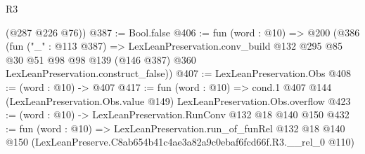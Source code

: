 \begin{lexlean}{R3}
\begin{coremodule}
      (@287 @226 @76))
@387 := Bool.false
@406 := fun (word : @10) =>
  @200
    (@386
      (fun ("_" : @113 @387) =>
      LexLeanPreservation.conv_build
        @132
        @295
        @85
        @30
        @51
        @98
        @98
        @139
        (@146 @387)
        @360
        LexLeanPreservation.construct_false))
@407 := LexLeanPreservation.Obs
@408 := (word : @10) -> @407
@417 := fun (word : @10) =>
  cond.{1} @407 @144 (LexLeanPreservation.Obs.value @149) LexLeanPreservation.Obs.overflow
@423 := (word : @10) -> LexLeanPreservation.RunConv @132 @18 @140 @150
@432 := fun (word : @10) =>
  LexLeanPreservation.run_of_funRel
    @132
    @18
    @140
    @150
    (LexLeanPreserve.C8ab654b41c4ae3a82a9c0ebaf6fcd66f.R3.__rel_0 @110)
\end{coremodule}
\end{lexlean}

